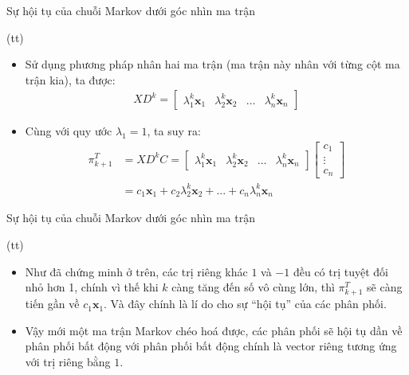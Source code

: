 \begin{frame}{Sự hội tụ của chuỗi Markov dưới góc nhìn ma trận}
    \begin{myproof*}{(tt)}
    \begin{itemize}
        \item[\bullet] Sử dụng phương pháp nhân hai ma trận (ma trận này nhân với từng cột ma trận kia), ta được:
        \begin{align}
            X D^k =  
            \begin{bmatrix}
            \lambda_1^k\textbf{x}_1& \lambda_2^k\textbf{x}_2 & \dots&\lambda_n^k\textbf{x}_n
            \end{bmatrix} 
        \end{align}

        \item[\bullet] Cùng với quy ước $\lambda_1 = 1$, ta suy ra:
        \begin{align}
            \pi_{k+1}^T &= X D^k C = \begin{bmatrix}
            \lambda_1^k\textbf{x}_1& \lambda_2^k\textbf{x}_2 & \dots&\lambda_n^k\textbf{x}_n
            \end{bmatrix} \begin{bmatrix}
                c_1 \\
                \vdots \\
                c_n
            \end{bmatrix}\\
            &= c_1\textbf{x}_1 + c_2 \lambda_2^k \textbf{x}_2 + ... + c_n \lambda_n^k \textbf{x}_n
        \end{align}
    \end{itemize}
    \end{myproof*}
\end{frame}

\begin{frame}{Sự hội tụ của chuỗi Markov dưới góc nhìn ma trận}
    \begin{myproof*}{(tt)}
    \begin{itemize}
     
        \item[\bullet] Như đã chứng minh ở trên, các trị riêng khác $1$ và $-1$ đều có trị tuyệt đối nhỏ hơn 1, chính vì thế khi $k$ càng tăng đến số vô cùng lớn, thì $\pi_{k+1}^T$ sẽ càng tiến gần về $c_1\textbf{x}_1$. Và đây chính là lí do cho sự ``hội tụ'' của các phân phối.

        \item[\bullet] Vậy mới một ma trận Markov chéo hoá được, các phân phối sẽ hội tụ dần về phân phối bất động với phân phối bất động chính là vector riêng tương ứng với trị riêng bằng $1$.
    \end{itemize}
    \end{myproof*}
    
\end{frame}